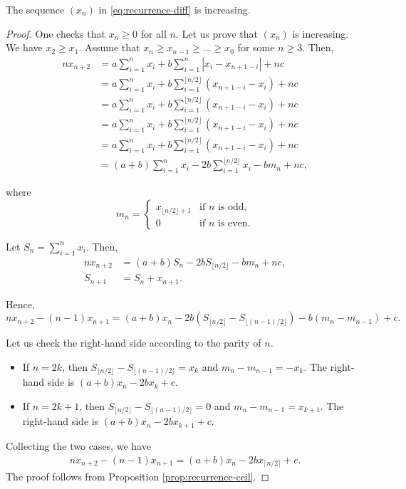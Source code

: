 \begin{lemma}
  The sequence $(x_n)$ in \eqref{eq:recurrence-diff} is increasing.
\end{lemma}

\begin{proof}
  One checks that $x_n\ge 0$ for all $n$. Let us prove that $(x_n)$ is increasing. We have $x_2\ge x_1$. Assume that $x_n\ge x_{n-1} \ge \ldots \ge x_0$ for some $n\ge 3$. Then,
  \begin{align*}
    n x_{n+2} & = a\sum_{i=1}^{n}x_i + b\sum_{i=1}^{n}|x_i - x_{n+1-i}| + nc                   \\
              & = a\sum_{i=1}^{n}x_i + b\sum_{i=1}^{\lfloor n/2\rfloor} (x_{n+1-i} - x_i) + nc \\
              & = a\sum_{i=1}^{n}x_i + b\sum_{i=1}^{\lfloor n/2\rfloor} (x_{n+1-i} - x_i) + nc \\
              & = a\sum_{i=1}^{n}x_i + b\sum_{i=1}^{\lfloor n/2\rfloor} (x_{n+1-i} - x_i) + nc \\
              & = a\sum_{i=1}^{n}x_i + b\sum_{i=1}^{\lfloor n/2\rfloor} (x_{n+1-i} - x_i) + nc \\
              & = (a+b)\sum_{i=1}^{n}x_i - 2b\sum_{i=1}^{\lfloor n/2\rfloor} x_i - bm_n + nc,
  \end{align*}

  where
  $$m_n =
    \begin{cases} x_{\lfloor n/2\rfloor+1} & \text{if } n \text{ is odd}, \\ 0 & \text{if } n \text{ is even}.
    \end{cases}$$

  Let $S_n = \sum_{i=1}^n x_i$. Then,
  \begin{align*}
    nx_{n+2} & = (a+b)S_n - 2b S_{\lfloor n/2\rfloor}  -bm_n + nc, \\
    S_{n+1}  & = S_n + x_{n+1}.
  \end{align*}

  Hence,
  $$nx_{n+2} - (n-1)x_{n+1} = (a+b)x_n - 2b(S_{\lfloor n/2\rfloor} - S_{\lfloor (n-1)/2\rfloor}) - b(m_n - m_{n-1}) + c.$$

  Let us check the right-hand side according to the parity of $n$.

  \begin{itemize}
    \item If $n=2k$, then $S_{\lfloor n/2\rfloor} - S_{\lfloor (n-1)/2\rfloor} = x_k$ and $m_n - m_{n-1} = -x_{k}$. The right-hand side is $(a+b)x_n - 2bx_k + c$.
    \item If $n=2k+1$, then $S_{\lfloor n/2\rfloor} - S_{\lfloor (n-1)/2\rfloor} = 0$ and $m_n - m_{n-1} = x_{k+1}$. The right-hand side is $(a+b)x_n - 2bx_{k+1} + c$.
  \end{itemize}

  Collecting the two cases, we have
  \begin{align*}
    nx_{n+2} - (n-1)x_{n+1} = (a+b)x_n - 2b x_{\lceil n/2\rceil} + c.
  \end{align*}
  The proof follows from Proposition \ref{prop:recurrence-ceil}.
\end{proof}

